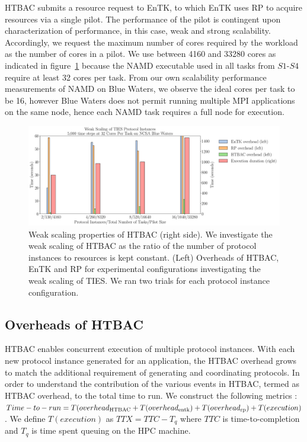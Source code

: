 HTBAC submits a resource request to EnTK, to which EnTK uses 
RP to acquire resources via a single pilot. The performance of 
the pilot is contingent upon characterization of 
performance, in this case, weak and strong scalability. Accordingly, we request the maximum number of cores required
by the workload as the number of cores in a pilot. We use between
4160 and 33280 cores as indicated in figure~\ref{fig:weak_scaling}
because the NAMD executable used in all tasks from $S1$-$S4$ require at 
least 32 cores per task. From our own scalability performance measurements of 
NAMD on Blue Waters, we observe the ideal cores per task to be 16,
however Blue Waters does not permit running multiple MPI applications on the same node, hence each NAMD task requires a full node for execution.

\begin{figure}
  \centering
   \includegraphics[width=\columnwidth]{figures/weak_scaling_TIES_instances_5,000_timesteps}
  \caption{Weak scaling properties of HTBAC (right side). We investigate the
  weak scaling of HTBAC as the ratio of the number of protocol instances to
  resources is kept constant. (Left) Overheads of HTBAC, EnTK and RP for
  experimental configurations investigating the weak scaling of TIES. We ran two trials for each protocol instance 
  configuration. 
  }
\label{fig:weak_scaling}
\end{figure}


\subsection{Overheads of HTBAC}

HTBAC enables concurrent execution of multiple protocol instances. With each new protocol instance generated for an 
application, the HTBAC overhead grows to match the additional
requirement of generating and coordinating protocols. In order
to understand the contribution of the various events in HTBAC, 
termed as HTBAC overhead, to the total time to run. 
We construct the following metrics :
\(Time-to-run = T(overhead\textsubscript{HTBAC} + 
T(overhead\textsubscript{entk}) + 
T(overhead\textsubscript{rp}) + T(execution)\). We define \(T(execution)\) as \(TTX = TTC - T_q\) where \(TTC\) is
time-to-completion and \(T_q\) is time spent queuing on the HPC machine. 
